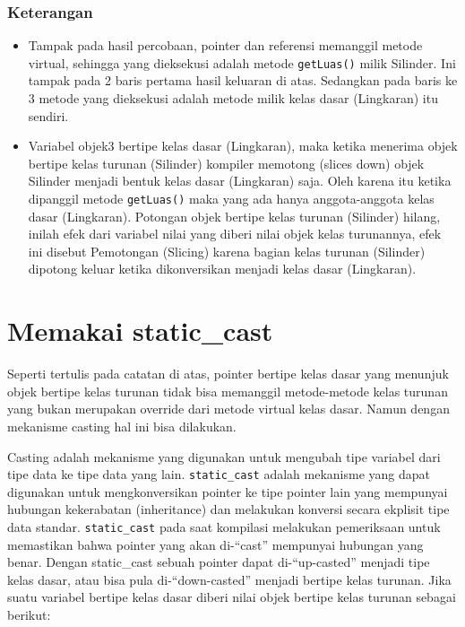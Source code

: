 \subsubsection*{Keterangan}

\begin{itemize}

\item
  Tampak pada hasil percobaan, pointer dan referensi memanggil metode
  virtual, sehingga yang dieksekusi adalah metode \texttt{getLuas()}
  milik Silinder. Ini tampak pada 2 baris pertama hasil keluaran di
  atas. Sedangkan pada baris ke 3 metode yang dieksekusi adalah metode
  milik kelas dasar (Lingkaran) itu sendiri.
\item
  Variabel objek3 bertipe kelas dasar (Lingkaran), maka ketika menerima
  objek bertipe kelas turunan (Silinder) kompiler memotong (slices down)
  objek Silinder menjadi bentuk kelas dasar (Lingkaran) saja. Oleh
  karena itu ketika dipanggil metode \texttt{getLuas()} maka yang ada
  hanya anggota-anggota kelas dasar (Lingkaran). Potongan objek bertipe
  kelas turunan (Silinder) hilang, inilah efek dari variabel nilai yang
  diberi nilai objek kelas turunannya, efek ini disebut Pemotongan
  (Slicing) karena bagian kelas turunan (Silinder) dipotong keluar
  ketika dikonversikan menjadi kelas dasar (Lingkaran).
\end{itemize}

\section{Memakai static\_cast}\label{memakai-staticux5fcast}

Seperti tertulis pada catatan di atas, pointer bertipe kelas dasar yang
menunjuk objek bertipe kelas turunan tidak bisa memanggil metode-metode
kelas turunan yang bukan merupakan override dari metode virtual kelas
dasar. Namun dengan mekanisme casting hal ini bisa dilakukan.

Casting adalah mekanisme yang digunakan untuk mengubah tipe variabel
dari tipe data ke tipe data yang lain. \texttt{static\_cast} adalah
mekanisme yang dapat digunakan untuk mengkonversikan pointer ke tipe
pointer lain yang mempunyai hubungan kekerabatan (inheritance) dan
melakukan konversi secara ekplisit tipe data standar.
\texttt{static\_cast} pada saat kompilasi melakukan pemeriksaan untuk
memastikan bahwa pointer yang akan di-``cast'' mempunyai hubungan yang
benar. Dengan static\_cast sebuah pointer dapat di-``up-casted'' menjadi
tipe kelas dasar, atau bisa pula di-``down-casted'' menjadi bertipe
kelas turunan. Jika suatu variabel bertipe kelas dasar diberi nilai
objek bertipe kelas turunan sebagai berikut:

